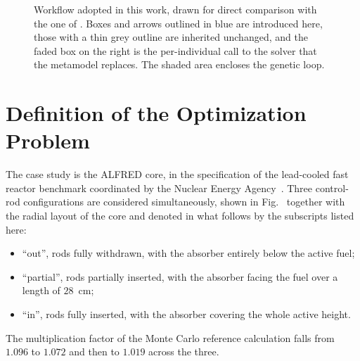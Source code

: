 \begin{figure}[htbp]
{}
  \caption[Workflow adopted in this work]{Workflow adopted in this work, drawn for direct comparison with the
  one of \citet{prevMulti}. Boxes and arrows outlined in blue are introduced
  here, those with a thin grey outline are inherited unchanged, and the faded box
  on the right is the per-individual call to the solver that the metamodel
  replaces. The shaded area encloses the genetic loop.}
  \label{eg:fig:flow}
\end{figure}


\section{Definition of the Optimization Problem}

The case study is the ALFRED core, in the specification of the lead-cooled fast
reactor benchmark coordinated by the Nuclear Energy Agency~\cite{neaBench}.
Three control-rod configurations are considered simultaneously, shown in
Fig.~ together with the radial layout of the core and denoted
in what follows by the subscripts listed here:
\begin{itemize}
  \item ``out'', rods fully withdrawn, with the absorber entirely below the
    active fuel;
  \item ``partial'', rods partially inserted, with the absorber facing the fuel
    over a length of $28$~cm;
  \item ``in'', rods fully inserted, with the absorber covering the whole active
    height.
\end{itemize}
The multiplication factor of the Monte Carlo reference calculation falls from
$1.096$ to $1.072$ and then to $1.019$ across the three.

